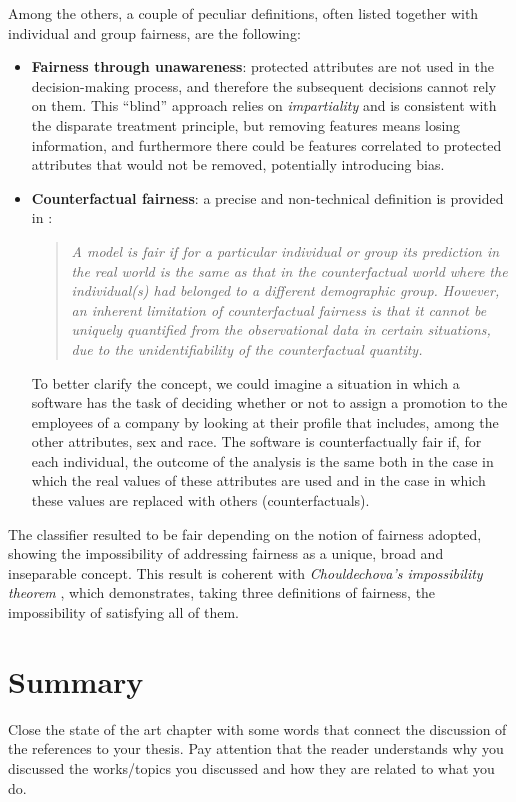 Among the others, a couple of peculiar definitions, often listed together with individual and group fairness, are the following:
\begin{itemize}
\item \textbf{Fairness through unawareness}: protected attributes are not used in the decision-making process, and therefore the subsequent decisions cannot rely on them. This ``blind'' approach relies on \textit{impartiality} and is consistent with the disparate treatment principle, but removing features means losing information, and furthermore there could be features correlated to protected attributes that would not be removed, potentially introducing bias.
\item \textbf{Counterfactual fairness}: a precise and non-technical definition is provided in \cite{wu2019counterfactual}:
\begin{quote}\emph{A model is fair if for a particular individual or group its prediction in the real world is the same as that in the counterfactual world where the individual(s) had belonged to a different demographic group. However, an inherent limitation of counterfactual fairness is that it cannot be uniquely quantified from the observational data in certain situations, due to the unidentifiability of the counterfactual quantity.} \cite[p.~1]{wu2019counterfactual}\end{quote}
To better clarify the concept, we could imagine a situation in which a software has the task of deciding whether or not to assign a promotion to the employees of a company by looking at their profile that includes, among the other attributes, sex and race. The software is counterfactually fair if, for each individual, the outcome of the analysis is the same both in the case in which the real values of these attributes are used and in the case in which these values are replaced with others (counterfactuals).
\end{itemize}

The classifier resulted to be fair depending on the notion of fairness adopted, showing the impossibility of addressing fairness as a unique, broad and inseparable concept. This result is coherent with \textit{Chouldechova's impossibility theorem} \cite{chouldechova2017fair}, which demonstrates, taking three definitions of fairness, the impossibility of satisfying all of them.


\iffalse

\section{Summary}
Close the state of the art chapter with some words that connect the discussion of the references to your thesis. Pay attention that the reader understands why you discussed the works/topics you discussed and how they are related to what you do.

